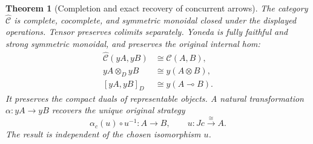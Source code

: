 \documentclass[11pt,a4paper]{article}
\numberwithin{equation}{section}
\newtheorem{theorem}{Theorem}[section]
\theoremstyle{definition}
\theoremstyle{remark}
\theoremstyle{plain}
\begin{document}
\begin{theorem}[Completion and exact recovery of concurrent arrows]
\label{thm:egt-day-preservation}
The category $\widehat{\mathcal C}$ is complete, cocomplete, and
symmetric monoidal closed under the displayed operations. Tensor
preserves colimits separately. Yoneda is fully faithful and strong
symmetric monoidal, and preserves the original internal hom:
\[
 \begin{aligned}
 \widehat{\mathcal C}(yA,yB)&\cong\mathcal C(A,B),\\
 yA\otimes_D yB&\cong y(A\otimes B),\\
 [yA,yB]_D&\cong y(A\multimap B).
 \end{aligned}
\]
It preserves the compact duals of representable objects. A natural
transformation $\alpha:yA\to yB$ recovers the unique original strategy
\[
 \alpha_c(u)\circ u^{-1}:A\longrightarrow B,
 \qquad u:Jc\xrightarrow{\cong}A.
\]
The result is independent of the chosen isomorphism $u$.
\end{theorem}
\end{document}
